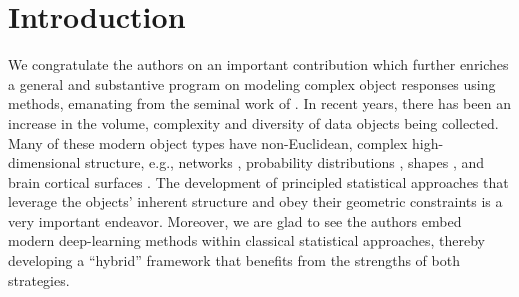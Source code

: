 \section{Introduction}

We congratulate the authors on an important contribution which further enriches a general and substantive program on modeling complex object responses using \Frechet methods, emanating from the seminal work of \textcite{petersen_frechet_2019}.
In recent years, there has been an increase in the volume, complexity and diversity of data objects being collected.
Many of these modern object types have non-Euclidean, complex high-dimensional structure, e.g., networks \parencite{desai_connectivity_2023, zhou_network_2022}, probability distributions \parencite{kneip_inference_2001,petersen_functional_2016, yang_quantile_2020}, shapes \parencite{wu_shape-based_2024}, and brain cortical surfaces \parencite{Chung2022BrainSurfaces}.
The development of principled statistical approaches that leverage the objects' inherent structure and obey their geometric constraints is a very important endeavor.
Moreover, we are glad to see the authors embed modern deep-learning methods within classical statistical approaches, thereby developing a ``hybrid'' framework that benefits from the strengths of both strategies.


